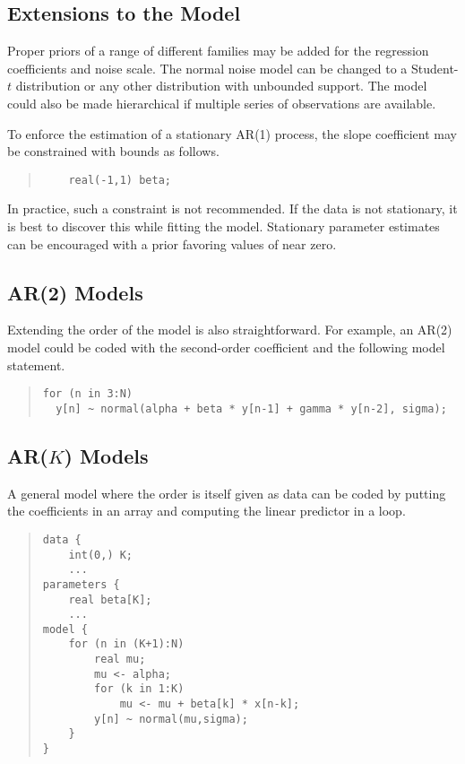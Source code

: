 \subsection{Extensions to the Model} 

Proper priors of a range of different families may be added for the
regression coefficients and noise scale.  The normal noise model can
be changed to a Student-$t$ distribution or any other distribution
with unbounded support.  The model could also be made hierarchical if
multiple series of observations are available.  

To enforce the estimation of a stationary AR(1) process, the slope
coefficient  may be constrained with bounds as follows.
%
\begin{quote}
\begin{Verbatim}
    real(-1,1) beta;
\end{Verbatim}
\end{quote}
%
In practice, such a constraint is not recommended.  If the data is not
stationary, it is best to discover this while fitting the model.
Stationary parameter estimates can be encouraged with a prior favoring
values of  near zero.


\subsection{AR(2) Models}

Extending the order of the model is also straightforward.  For
example, an AR(2) model could be coded with the second-order
coefficient  and the following model statement.
%
\begin{quote}
\begin{Verbatim}
for (n in 3:N)
  y[n] ~ normal(alpha + beta * y[n-1] + gamma * y[n-2], sigma);
\end{Verbatim}
\end{quote}


\subsection{AR($K$) Models}

A general model where the order is itself given as data can be coded
by putting the coefficients in an array and computing the linear
predictor in a loop.
%
\begin{quote}
\begin{Verbatim}
data {
    int(0,) K;
    ...
parameters {
    real beta[K];
    ...
model {
    for (n in (K+1):N)
        real mu;
        mu <- alpha;
        for (k in 1:K)
            mu <- mu + beta[k] * x[n-k];
        y[n] ~ normal(mu,sigma);
    }
}
\end{Verbatim}
\end{quote}





